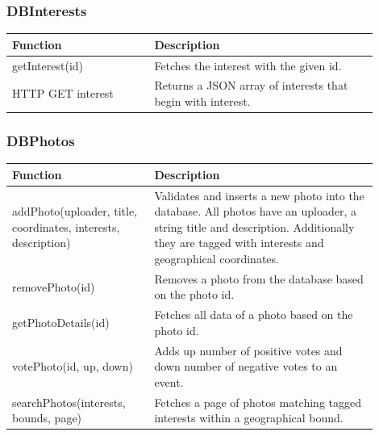 \subsubsection{DBInterests}
\begin{minipage}{\linewidth}
  \centering
  \setlength{\tabcolsep}{12pt}
  \begin{tabular}{|p{0.35\linewidth}|p{0.55\linewidth}|}
  \hline
  \cellcolor{gray!25} Function & \cellcolor{gray!25} Description \\
  \hline
  getInterest(id) & Fetches the interest with the given id. \\
  HTTP GET interest & Returns a JSON array of interests that begin with interest. \\
  \hline  
  \end{tabular}
\end{minipage}

\subsubsection{DBPhotos}
\begin{minipage}{\linewidth}
  \centering
  \setlength{\tabcolsep}{12pt}
  \begin{tabular}{|p{0.35\linewidth}|p{0.55\linewidth}|}
  \hline
  \cellcolor{gray!25} Function & \cellcolor{gray!25} Description \\
  \hline
  addPhoto(uploader, title, coordinates, interests, description) & Validates and inserts a new photo into the database. All photos have an uploader, a string title and description. Additionally they are tagged with interests and geographical coordinates. \\
  removePhoto(id) & Removes a photo from the database based on the photo id. \\
  getPhotoDetails(id) & Fetches all data of a photo based on the photo id. \\
  votePhoto(id, up, down) & Adds up number of positive votes and down number of negative votes to an event. \\
  searchPhotos(interests, bounds, page) & Fetches a page of photos matching tagged interests within a geographical bound. \\
  \hline  
  \end{tabular}
\end{minipage}

